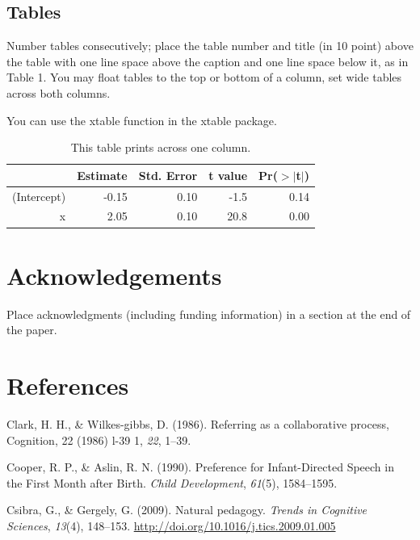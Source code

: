 \documentclass[10pt, letterpaper]{article}
\begin{document}
\subsection{Tables}\label{tables}

Number tables consecutively; place the table number and title (in 10
point) above the table with one line space above the caption and one
line space below it, as in Table 1. You may float tables to the top or
bottom of a column, set wide tables across both columns.

You can use the xtable function in the xtable package.

\begin{table}[H]
\centering
\begin{tabular}{rrrrr}
  \hline
 & Estimate & Std. Error & t value & Pr($>$$|$t$|$) \\ 
  \hline
(Intercept) & -0.15 & 0.10 & -1.5 & 0.14 \\ 
  x & 2.05 & 0.10 & 20.8 & 0.00 \\ 
   \hline
\end{tabular}
\caption{This table prints across one column.} 
\end{table}

\section{Acknowledgements}\label{acknowledgements}

Place acknowledgments (including funding information) in a section at
the end of the paper.

\section{References}\label{references}

\setlength{\parindent}{-0.1in} \setlength{\leftskip}{0.125in} \noindent

\hypertarget{refs}{}
\hypertarget{ref-Clark1986}{}
Clark, H. H., \& Wilkes-gibbs, D. (1986). Referring as a collaborative
process, Cognition, 22 (1986) l-39 1, \emph{22}, 1--39.

\hypertarget{ref-Cooper1990}{}
Cooper, R. P., \& Aslin, R. N. (1990). Preference for Infant-Directed
Speech in the First Month after Birth. \emph{Child Development},
\emph{61}(5), 1584--1595.

\hypertarget{ref-Csibra2009}{}
Csibra, G., \& Gergely, G. (2009). Natural pedagogy. \emph{Trends in
Cognitive Sciences}, \emph{13}(4), 148--153.
\url{http://doi.org/10.1016/j.tics.2009.01.005}
\end{document}
